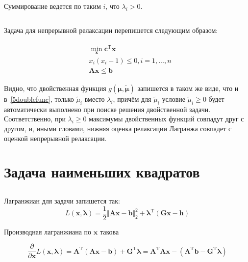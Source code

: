 	Суммирование ведется по таким $i$, что $\lambda_i > 0$.
	

	\subsection{}
	
	Задача для непрерывной релаксации перепишется следующим образом:
	
	\begin{align}
	\begin{aligned}
	&\min_{\mathbf{x}} \mathbf{c}^{\text{T}}\mathbf{x} \\
	&x_i(x_i-1) \leqslant 0, i= 1,...,n\\
	&\mathbf{A}\mathbf{x} \leqslant \mathbf{b}
	\end{aligned}
	\end{align}
	
	Видно, что двойственная функция $g(\boldsymbol{\mu},\boldsymbol{\tilde{\mu}})$ запишется в таком же виде, что и в~\eqref{5doublefunc}, только $\tilde{\mu}_i$ вместо $\lambda_i$, причём для $\tilde{\mu}_i$ условие $\tilde{\mu}_i \geqslant 0$ будет автоматически выполнено при поиске решения двойственной задачи. Соответственно, при $\lambda_i \geqslant 0$ максимумы двойственных функций совпадут друг с другом, и, иными словами, нижняя оценка релаксации Лагранжа совпадет с оценкой непрерывной релаксации.
	
	\subsection{}
	
	
	\section{Задача наименьших квадратов}
	
	\subsection{}
	Лагранжиан для задачи запишется так:
	\begin{equation}
	L(\mathbf{x},\boldsymbol{\lambda}) = \frac 12 \Vert \mathbf{A}\mathbf{x}-\mathbf{b} \Vert_2^2 +\boldsymbol{\lambda}^{\text{T}} (\mathbf{G}\mathbf{x}-\textbf{h}) 
	\end{equation}
	
	Производная лагранжиана по $\mathbf{x}$ такова 
	
	\begin{equation}
	\frac{\partial}{\partial \mathbf{x}}L(\mathbf{x},\boldsymbol{\lambda}) = \mathbf{A}^{\text{T}}(\mathbf{A}\mathbf{x}-\mathbf{b}) +\mathbf{G}^{\text{T}}\boldsymbol{\lambda} = \mathbf{A}^{\text{T}}\mathbf{A}\mathbf{x}-(\mathbf{A}^{\text{T}}\mathbf{b} -\mathbf{G}^{\text{T}}\boldsymbol{\lambda})
	\end{equation}
	
